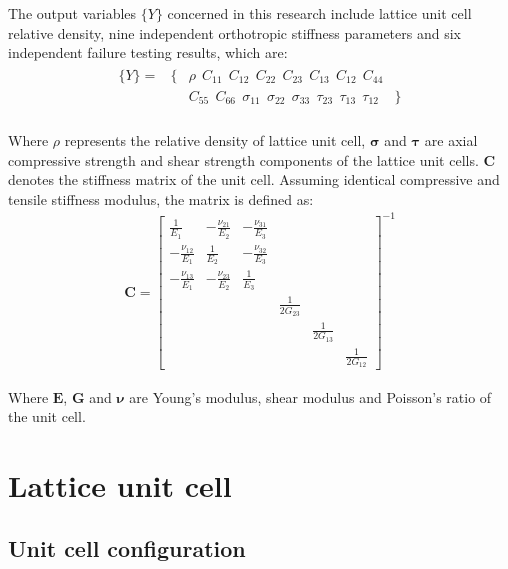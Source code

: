 \documentclass[12pt]{extbook}
\begin{document}
The output variables $\{Y\}$ concerned in this research include lattice unit cell relative density, nine independent orthotropic stiffness parameters and six independent failure testing results, which are:
\begin{equation}
\begin{split}
\begin{array}{llll}
\{Y\} = &\{&\rho~~C_{11}~~C_{12}~~C_{22}~~C_{23}~~C_{13}~~C_{12}~~C_{44}&\\
&&C_{55}~~C_{66}~~{\sigma}_{11}~~{\sigma}_{22}~~{\sigma}_{33}~~{\tau}_{23}~~{\tau}_{13}~~{\tau}_{12}&\}\\
\end{array}
\end{split}
\label{2-1-18}
\end{equation}

Where $\rho$ represents the relative density of lattice unit cell, ${\bm{\sigma}}$ and $\bm{\tau}$ are axial compressive strength and shear strength components of the lattice unit cells. $\bm{C}$ denotes the stiffness matrix of the unit cell. Assuming identical compressive and tensile stiffness modulus, the matrix is defined as:
\begin{equation}
\begin{split}
\bm{C} =
\left [ \begin{array}{cccccc}
\frac{1}{E_1}&-\frac{\nu_{21}}{E_2}&-\frac{\nu_{31}}{E_3}&&&\\
-\frac{\nu_{12}}{E_1}&\frac{1}{E_2}&-\frac{\nu_{32}}{E_3}&&&\\
-\frac{\nu_{13}}{E_1}&-\frac{\nu_{23}}{E_2}&\frac{1}{E_3}&&&\\
&&&\frac{1}{2G_{23}}&&\\
&&&&\frac{1}{2G_{13}}&\\
&&&&&\frac{1}{2G_{12}}
\end{array}\right ]^{-1}
\end{split}
\label{2-1-19}
\end{equation}

Where $\bm{E}$, $\bm{G}$ and $\bm{\nu}$ are Young's modulus, shear modulus and Poisson's ratio of the unit cell.\\


\section{Lattice unit cell}
\label{gauss_data}

\subsection{Unit cell configuration}
\end{document}

